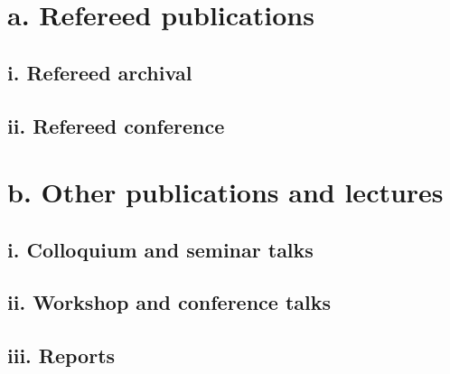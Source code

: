 \documentclass{article}
\begin{document}


\section*{a. Refereed publications}

\subsection*{i. Refereed archival}



\subsection*{ii. Refereed conference}




\section*{b. Other publications and lectures}

\subsection*{i. Colloquium and seminar talks}



\subsection*{ii. Workshop and conference talks}



\subsection*{iii. Reports}



\end{document}
